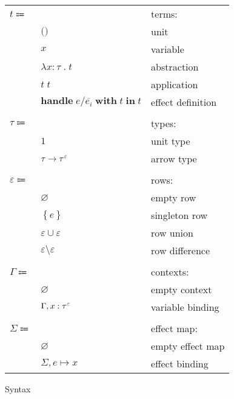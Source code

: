 \documentclass[12pt]{article}
\newcommand\anno[2]{#1 : #2}
\newcommand\term{t}
\newcommand\eUnit{\texttt{()}}
\newcommand\eVar{x}
\newcommand\eAbs[2]{\lambda #1 \; . \; #2}
\newcommand\eApp[2]{#1 \; #2}
\newcommand\eHandle[4]{\textbf{handle} \; #1 / #2 \; \textbf{with} \; #3 \; \textbf{in} \; #4}
\newcommand\type{\tau}
\newcommand\tUnit{1}
\newcommand\tArrow[2]{#1 \rightarrow #2}
\newcommand\tEmbellished[2]{{#1}^{\textcolor{violet}{#2}}}
\newcommand\row{\varepsilon}
\newcommand\rEmpty{\varnothing}
\newcommand\rSingleton[1]{\left\{ #1 \right\}}
\newcommand\rUnion[2]{#1 \cup #2}
\newcommand\rDiff[2]{#1 \setminus #2}
\newcommand\context{\Gamma}
\newcommand\cEmpty{\varnothing}
\newcommand\cExtend[2]{#1, #2}
\newcommand\effect{e}
\newcommand\effectMap{\Sigma}
\newcommand\emMap[2]{#1 \mapsto #2}
\newcommand\emEmpty{\varnothing}
\newcommand\emExtend[2]{#1, #2}
\begin{document}
      \begin{figure}[H]
        \begin{mdframed}[backgroundcolor=none]
          \begin{center}
            \begin{tabular}{l l l}
              $\term \Coloneqq $ & & terms: \\
              & $\eUnit$ & unit \\
              & $\eVar$ & variable \\
              & $\eAbs{\anno{\eVar}{\type}}{\term}$ & abstraction \\
              & $\eApp{\term}{\term}$ & application \\
              & $\eHandle{\effect}{\overline{\effect_i}}{\term}{\term}$ & effect definition \\
              \\
              $\type \Coloneqq$ & & types: \\
              & $\tUnit$ & unit type \\
              & $\tArrow{\type}{\tEmbellished{\type}{\row}}$ & arrow type \\
              \\
              $\row \Coloneqq$ & & rows: \\
              & $\rEmpty$ & empty row \\
              & $\rSingleton{\effect}$ & singleton row \\
              & $\rUnion{\row}{\row}$ & row union \\
              & $\rDiff{\row}{\row}$ & row difference \\
              \\
              $\context \Coloneqq$ & & contexts: \\
              & $\cEmpty$ & empty context \\
              & $\cExtend{\context}{\anno{\eVar}{\tEmbellished{\type}{\row}}}$ & variable binding \\
              \\
              $\effectMap \Coloneqq$ & & effect map: \\
              & $\emEmpty$ & empty effect map \\
              & $\emExtend{\effectMap}{\emMap{\effect}{\eVar}}$ & effect binding \\
            \end{tabular}
          \end{center}

          \caption{Syntax}\label{fig:syntax}
        \end{mdframed}
      \end{figure}
\end{document}
